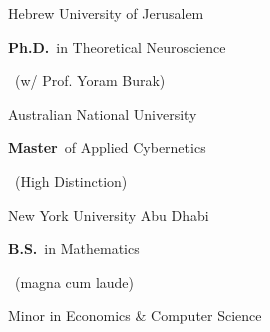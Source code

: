 	{%
		Hebrew University of Jerusalem}
	{%
		\textbf{Ph.D.}~in Theoretical Neuroscience\\
		\begin{footnotesize}
				~(w/ Prof. Yoram Burak)
		\end{footnotesize}}
	{%
	}


		{%
			Australian National University}
		{%
			\textbf{Master}~of Applied Cybernetics\begin{footnotesize}
				~(High Distinction)
			\end{footnotesize}}
		{%
		}

		{%
			New York University Abu Dhabi}
		{%
			\textbf{B.S.}~in Mathematics\begin{footnotesize}
				~(magna cum laude)
			\end{footnotesize}}
		{%
		Minor in Economics \& Computer Science}